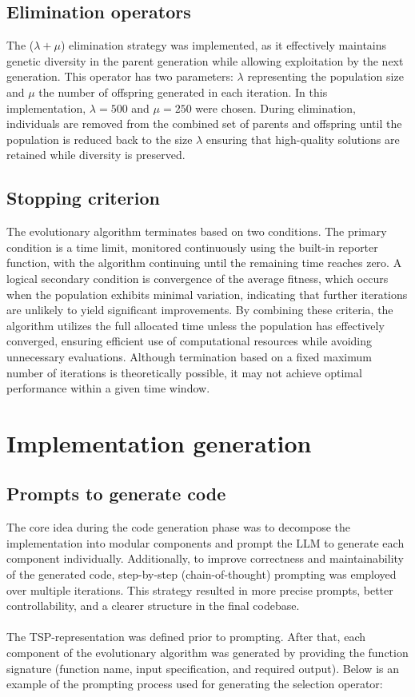 \documentclass[a4paper,10pt]{article}
\begin{document}
\subsection{Elimination operators}
The ($\lambda + \mu$) elimination strategy was implemented, as it effectively maintains genetic diversity in the parent generation while allowing exploitation by the next generation. This operator has two parameters: $\lambda$ representing the population size and $\mu$ the number of offspring generated in each iteration. In this implementation, $\lambda = 500$ and $\mu = 250$ were chosen. During elimination, individuals are removed from the combined set of parents and offspring until the population is reduced back to the size $\lambda$ ensuring that high-quality solutions are retained while diversity is preserved.

\subsection{Stopping criterion}

The evolutionary algorithm terminates based on two conditions. The primary condition is a time limit, monitored continuously using the built-in reporter function, with the algorithm continuing until the remaining time reaches zero. A logical secondary condition is convergence of the average fitness, which occurs when the population exhibits minimal variation, indicating that further iterations are unlikely to yield significant improvements. By combining these criteria, the algorithm utilizes the full allocated time unless the population has effectively converged, ensuring efficient use of computational resources while avoiding unnecessary evaluations. Although termination based on a fixed maximum number of iterations is theoretically possible, it may not achieve optimal performance within a given time window.


\section{Implementation generation}

\subsection{Prompts to generate code}
The core idea during the code generation phase was to decompose the implementation into modular components and prompt the LLM to generate each component individually. Additionally, to improve correctness and maintainability of the generated code, step-by-step (chain-of-thought) prompting was employed over multiple iterations. This strategy resulted in more precise prompts, better controllability, and a clearer structure in the final codebase.
\\\\
The TSP-representation was defined prior to prompting. After that, each component of the evolutionary algorithm was generated  by providing the function signature (function name, input specification, and required output). Below is an example of the prompting process used for generating the selection operator:
\end{document}
